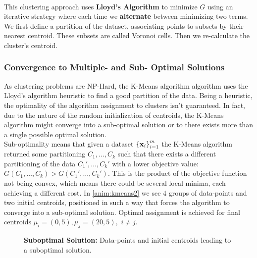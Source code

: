 ~\\ This clustering approach uses \textbf{Lloyd's Algorithm} to minimize $G$ using an iterative strategy where each time we \textbf{alternate} between minimizing two terms. We first define a partition of the dataset, associating points to subsets by their nearest centroid. These subsets are called Voronoi cells. Then we re-calculate the cluster's centroid.


\begin{figure}[h!]
	\centering
	\label{anim:kmeans1}
\end{figure}

\subsubsection{Convergence to Multiple- and Sub- Optimal Solutions}
As clustering problems are NP-Hard, the K-Means algorithm algorithm uses the Lloyd's algorithm heuristic to find a good partition of the data. Being a heuristic, the optimality of the algorithm assignment to clusters isn't guaranteed. In fact, due to the nature of the random initialization of centroids, the K-Means algorithm might converge into a sub-optimal solution or to there exists more than a single possible optimal solution.~\\

Sub-optimality means that given a dataset $\left\{\mathbf{x}_i\right\}^m_{i=1}$ the K-Means algorithm returned some partitioning $C_1,\ldots,C_k$ such that there exists a different partitioning of the data $C_1',\ldots,C_k'$ with a lower objective value: $G\left(C_1,\ldots,C_k\right) > G\left(C_1',\ldots,C_k'\right)$. This is the product of the objective function not being convex, which means there could be several local minima, each achieving a different cost. In \autoref{anim:kmeans2} we see 4 groups of data-points and two initial centroids, positioned in such a way that forces the algorithm to converge into a sub-optimal solution. Optimal assignment is achieved for final centroids $\mu_i=\left(0,5\right), \mu_j=\left(20,5\right),\,\,i\neq j$.

\begin{figure}[h!]
	\centering
	\caption{\textbf{Suboptimal Solution:} Data-points and initial centroids leading to a suboptimal solution.}
	\label{anim:kmeans2}
\end{figure}



